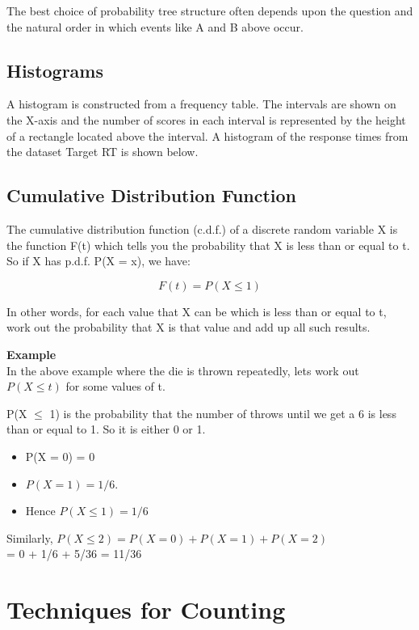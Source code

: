 The best choice of probability tree structure often depends upon the question and the natural order in which events like A and B above occur.


\subsection{Histograms}
A histogram is constructed from a frequency table. The intervals are shown on the X-axis and the number of scores in each interval is represented by the height of a rectangle located above the interval. A histogram of the response times from the dataset Target RT is shown below.



\subsection{Cumulative Distribution Function}

The cumulative distribution function (c.d.f.) of a discrete random variable X is the function F(t) which tells you the probability that X is less than or equal to t. So if X has p.d.f. P(X = x), we have:

\[F(t) = P(X \leq 1)\] %

In other words, for each value that X can be which is less than or equal to t, work out the probability that X is that value and add up all such results.

\textbf{Example}\\

In the above example where the die is thrown repeatedly, lets work out $P(X \leq t)$ for some values of t.

P(X $\leq$ 1) is the probability that the number of throws until we get a 6 is less than or equal to 1. So it is either 0 or 1. 

\begin{itemize}
\item P(X = 0) = 0 
\item $P(X = 1) = 1/6$.
\item  Hence $P(X \leq 1) = 1/6$
\end{itemize}

Similarly, $P(X \leq 2) = P(X = 0) + P(X = 1) + P(X = 2)$\\ = 0 + 1/6 + 5/36 = 11/36

\newpage
\section{Techniques for Counting}


